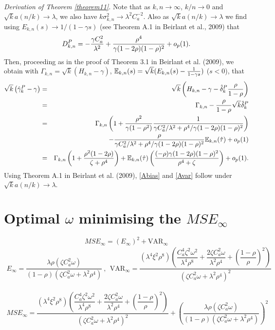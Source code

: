 \begin{subappendices}
\vspace{0.4cm}\noindent 
{\it Derivation of Theorem \ref{theorem11}.}
Note that as $k,n \to \infty$, $k/n \to 0$ and $\sqrt{k} a(n/k) \to \lambda$, we also have $k\sigma^2_{k,n} \to \lambda^2 C_a^{-2}$. Also as $\sqrt{k} a(n/k) \to \lambda$ we find using
$E_{k,n}(s) \to 1/(1-\gamma s)$ (see Theorem A.1 in Beirlant et al., 2009) that
$$
D^{P}_{k,n} = -{\gamma C_a^2 \over \lambda^2} 
+ {\rho^4 \over \gamma (1-2\rho)(1-\rho)^2} + o_p(1).
$$
Then, proceeding as in the proof of Theorem 3.1 in Beirlant et al. (2009), we obtain with $\Gamma_{k,n} = \sqrt{k}( H_{k,n}-\gamma)$, $\mathbb{E}_{k,n}(s) =\sqrt{k}(E_{k,n}(s)-{1\over 1-\gamma s })$ ($s<0$), that
\begin{eqnarray*}
	\sqrt{k} \left( \hat{\gamma}_k^{P}-\gamma \right)&=&
	\sqrt{k} \left( H_{k,n}-\gamma - \hat{\delta}_k^{P} {\rho \over 1-\rho} \right) 
	\\
	&=& \Gamma_{k,n}-{\rho \over 1-\rho}\sqrt{k}\hat{\delta}_k^{P} \\
	&=& \Gamma_{k,n}\left(1+ {\rho^2 \over \gamma(1-\rho^2)}
	{1 \over \gamma C_a^2/\lambda^2+ \rho^4/\gamma(1-2\rho)(1-\rho)^2} \right) \\
	&&- {\rho \over \gamma C_a^2/\lambda^2+\rho^4/\gamma(1-2\rho)(1-\rho)^2} \mathbb{E}_{k,n}(\hat\tau) +o_p(1)\\
	&=& \Gamma_{k,n} \left( 1+ {\rho^2 (1-2\rho)\over \zeta +\rho^4}\right) + 
	\mathbb{E}_{k,n}(\hat\tau)\left( {(-\rho)\gamma(1-2\rho)(1-\rho)^2 \over \rho^4 + \zeta }\right)+o_p(1).
\end{eqnarray*} 
Using Theorem A.1 in Beirlant et al. (2009), \eqref{Abias} and \eqref{Avar} follow under $\sqrt{k} a(n/k) \to \lambda$.
\label{appendix1}

\section{Optimal $\omega$ minimising the $MSE_{\infty}$}
$$
MSE_{\infty} = (E_{\infty})^2 + \text{VAR}_{\infty}
$$
\begin{eqnarray*}
E_{\infty} = \dfrac{\lambda \rho \left(\zeta C_a^2 \omega \right)}{(1-\rho ) \left(\zeta C_a^2 \omega +\lambda ^2 \rho ^4\right)}\ ,\ \ 
\text{VAR}_{\infty} = \dfrac{\left(\lambda ^4 \xi ^2 \rho ^8\right) \left(\dfrac{C_a^4 \zeta ^2 \omega ^2}{\lambda ^4 \rho ^8}+\dfrac{2 \zeta C_a^2 \omega }{\lambda ^2 \rho ^4}+\left(\dfrac{1-\rho }{\rho }\right)^2\right)}{\left(\zeta C_a^2 \omega +\lambda ^2 \rho ^4\right)^2}
\end{eqnarray*}

\begin{eqnarray*}
MSE_{\infty}= \dfrac{\left(\lambda ^4 \xi ^2 \rho ^8\right) \left(\dfrac{C_a^4 \zeta ^2 \omega ^2}{\lambda ^4 \rho ^8}+\dfrac{2 \zeta C_a^2 \omega }{\lambda ^2 \rho ^4}+\left(\dfrac{1-\rho }{\rho }\right)^2\right)}{\left(\zeta C_a^2 \omega +\lambda ^2 \rho ^4\right)^2}+\left(\dfrac{\lambda \rho \left(\zeta C_a^2 \omega \right)}{(1-\rho ) \left(\zeta C_a^2 \omega +\lambda ^2 \rho ^4\right)}\right)^2
\end{eqnarray*}


\end{subappendices}
